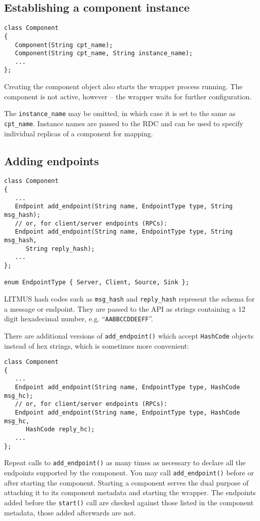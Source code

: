 \documentclass[12pt,a4paper,twoside]{article}
\renewcommand{\_}{\texttt{\symbol{95}}}
\begin{document}
\subsection{Establishing a component instance}

\begin{verbatim}
class Component
{
   Component(String cpt_name);
   Component(String cpt_name, String instance_name);
   ...
};
\end{verbatim}

Creating the component object also starts the wrapper process running.
The component is not active, however -- the wrapper waits for further
configuration.

The \verb^instance_name^ may be omitted, in which case it is set to
the same as \verb^cpt_name^. Instance names are passed to the RDC
and can be used to specify individual replicas of a component for
mapping.

\subsection{Adding endpoints}

\begin{verbatim}
class Component
{
   ...
   Endpoint add_endpoint(String name, EndpointType type, String msg_hash);
   // or, for client/server endpoints (RPCs):
   Endpoint add_endpoint(String name, EndpointType type, String msg_hash,
      String reply_hash);
   ...
};

enum EndpointType { Server, Client, Source, Sink };
\end{verbatim}

LITMUS hash codes such as \verb^msg_hash^ and \verb^reply_hash^
represent the schema for a message or endpoint.
They are passed to the API as strings containing a 12 digit
hexadecimal number, e.g. ``\verb^AABBCCDDEEFF^''.

There are additional versions of \verb^add_endpoint()^ which accept
\verb^HashCode^ objects instead of hex strings, which is sometimes
more convenient:

\begin{verbatim}
class Component
{
   ...
   Endpoint add_endpoint(String name, EndpointType type, HashCode msg_hc);
   // or, for client/server endpoints (RPCs):
   Endpoint add_endpoint(String name, EndpointType type, HashCode msg_hc,
      HashCode reply_hc);
   ...
};
\end{verbatim}

Repeat calls to \verb^add_endpoint()^ as many times as necessary
to declare all the endpoints supported by the component.
You may call \verb^add_endpoint()^ before or after starting the
component.
Starting a component serves the dual purpose of attaching it to
its component metadata and starting the wrapper.
The endpoints added before the \verb^start()^ call
are checked against those listed in the component metadata,
those added afterwards are not.
\end{document}
